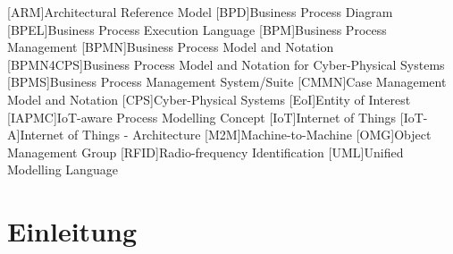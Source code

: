 \documentclass[a4paper, 12pt, twoside, headsepline=true]{scrartcl} %
\begin{document}
\tableofcontents
\clearpage
\newpage


\begin{acronym}[header=Abkürzungsverzeichnis]
	[ARM]{Architectural Reference Model}
	[BPD]{Business Process Diagram}
	[BPEL]{Business Process Execution Language}
	[BPM]{Business Process Management}
	[BPMN]{Business Process Model and Notation}
	[BPMN4CPS]{Business Process Model and Notation for Cyber-Physical Systems}
	[BPMS]{Business Process Management System/Suite}
	[CMMN]{Case Management Model and Notation}
	[CPS]{Cyber-Physical Systems}
	[EoI]{Entity of Interest}
	[IAPMC]{IoT-aware Process Modelling Concept}
	[IoT]{Internet of Things}
	[IoT-A]{Internet of Things - Architecture}
	[M2M]{Machine-to-Machine}
	[OMG]{Object Management Group}
	[RFID]{Radio-frequency Identification}
	[UML]{Unified Modelling Language}
\end{acronym}

\clearpage


\listoftables

\clearpage

\listoffigures
\clearpage


\section{Einleitung} \label{sec:section}

\end{document}
